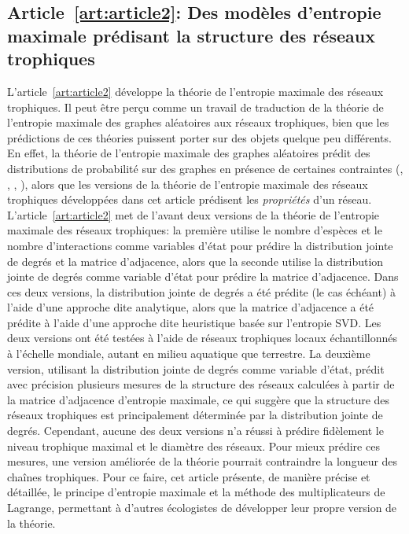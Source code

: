 \subsection{Article~\ref{art:article2}: Des modèles d'entropie maximale prédisant la structure des réseaux trophiques} 

L'article~\ref{art:article2} développe la théorie de l'entropie maximale des
réseaux trophiques. Il peut être perçu comme un travail de traduction de la
théorie de l'entropie maximale des graphes aléatoires aux réseaux trophiques,
bien que les prédictions de ces théories puissent porter sur des objets quelque
peu différents. En effet, la théorie de l'entropie maximale des graphes
aléatoires prédit des distributions de probabilité sur des graphes en présence
de certaines contraintes (\cite{Bianconi2007Entropy},
\cite{Bianconi2009Entropy}, \cite{Peixoto2012Entropy},
\cite{Coolen2017Generating}), alors que les versions de la théorie de l'entropie
maximale des réseaux trophiques développées dans cet article prédisent les
\textit{propriétés} d'un réseau. L'article~\ref{art:article2} met de l'avant
deux versions de la théorie de l'entropie maximale des réseaux trophiques: la
première utilise le nombre d'espèces et le nombre d'interactions comme variables
d'état pour prédire la distribution jointe de degrés et la matrice d'adjacence,
alors que la seconde utilise la distribution jointe de degrés comme variable
d'état pour prédire la matrice d'adjacence. Dans ces deux versions, la
distribution jointe de degrés a été prédite (le cas échéant) à l'aide d'une
approche dite analytique, alors que la matrice d'adjacence a été prédite à
l'aide d'une approche dite heuristique basée sur l'entropie SVD. Les deux
versions ont été testées à l'aide de réseaux trophiques locaux échantillonnés à
l'échelle mondiale, autant en milieu aquatique que terrestre. La deuxième
version, utilisant la distribution jointe de degrés comme variable d'état,
prédit avec précision plusieurs mesures de la structure des réseaux calculées à
partir de la matrice d'adjacence d'entropie maximale, ce qui suggère que la
structure des réseaux trophiques est principalement déterminée par la
distribution jointe de degrés. Cependant, aucune des deux versions n'a réussi à
prédire fidèlement le niveau trophique maximal et le diamètre des réseaux. Pour
mieux prédire ces mesures, une version améliorée de la théorie pourrait
contraindre la longueur des chaînes trophiques. Pour ce faire, cet article
présente, de manière précise et détaillée, le principe d'entropie maximale et la
méthode des multiplicateurs de Lagrange, permettant à d'autres écologistes de
développer leur propre version de la théorie. 

\endinput
 